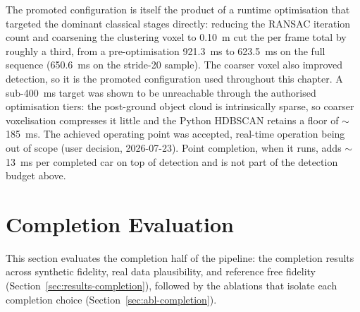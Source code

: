 \documentclass[a4paper,12pt]{report}
\begin{document}
The promoted configuration is itself the product of a runtime optimisation that
targeted the dominant classical stages directly: reducing the
RANSAC iteration count and coarsening the clustering voxel to \SI{0.10}{\metre}
cut the per frame total by roughly a third, from a pre-optimisation
\SI{921.3}{\milli\second} to \SI{623.5}{\milli\second} on the full sequence
(\SI{650.6}{\milli\second} on the stride-20 sample). The coarser voxel also
improved detection, so it is the promoted configuration used throughout
this chapter. A sub-\SI{400}{\milli\second} target was shown to be unreachable
through the authorised optimisation tiers: the post-ground object cloud is
intrinsically sparse, so coarser voxelisation compresses it little and the Python
HDBSCAN retains a floor of $\sim$\SI{185}{\milli\second}. The achieved
operating point was accepted, real-time operation being out of scope (user
decision, \num{2026}-07-23). Point completion, when it runs, adds
$\sim$\SI{13}{\milli\second} per completed car on top of detection and is not part
of the detection budget above.



%
%
\section{Completion Evaluation}
\label{sec:completion-evaluation}

This section evaluates the completion half of the pipeline: the completion
results across synthetic fidelity, real data plausibility, and reference free
fidelity (Section~\ref{sec:results-completion}), followed by the ablations
that isolate each completion choice (Section~\ref{sec:abl-completion}).
\end{document}
